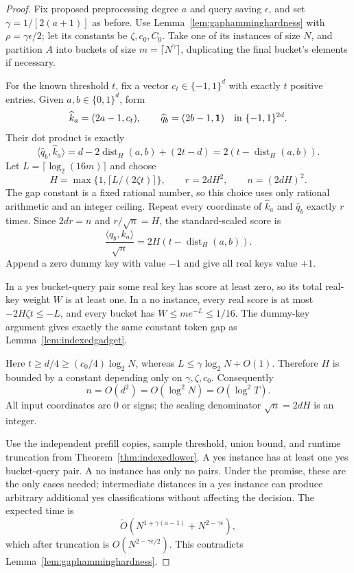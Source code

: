 \begin{proof}
Fix proposed preprocessing degree $a$ and query saving $\epsilon$,
and set $\gamma=1/[2(a+1)]$ as before.  Use
Lemma~\ref{lem:gaphamminghardness} with
$\rho=\gamma\epsilon/2$; let its constants be $\zeta,c_0,C_0$.
Take one of its instances of size $N$, and partition $A$ into buckets
of size $m=\lceil N^\gamma\rceil$, duplicating the final bucket's
elements if necessary.

For the known threshold $t$, fix a vector $c_t\in\{-1,1\}^d$
with exactly $t$ positive entries.  Given $a,b\in\{0,1\}^d$, form
\[
 \widehat k_a=(2a-1,c_t),\qquad
 \widehat q_b=(2b-1,\boldsymbol1)
 \quad\hbox{in }\{-1,1\}^{2d}.
\]
Their dot product is exactly
\begin{equation}
 \langle\widehat q_b,\widehat k_a\rangle
 =d-2\operatorname{dist}_H(a,b)+(2t-d)
 =2(t-\operatorname{dist}_H(a,b)).
 \label{eq:gaphammingdot}
\end{equation}
Let $L=\lceil\log_2(16m)\rceil$ and choose
\[
 H=\max\{1,\lceil L/(2\zeta t)\rceil\},\qquad
 r=2dH^2,\qquad n=(2dH)^2.
\]
The gap constant is a fixed rational number, so this choice uses only
rational arithmetic and an integer ceiling.  Repeat every coordinate
of $\widehat k_a$ and $\widehat q_b$ exactly $r$ times.  Since
$2dr=n$ and $r/\sqrt n=H$, the standard-scaled score is
\[
 \frac{\langle q_b,k_a\rangle}{\sqrt n}
 =2H(t-\operatorname{dist}_H(a,b)).
\]
Append a zero dummy key with value $-1$ and give all real keys value
$+1$.

In a yes bucket-query pair some real key has score at least zero,
so its total real-key weight $W$ is at least one.  In a no instance,
every real score is at most $-2H\zeta t\le-L$, and every bucket has
$W\le m e^{-L}\le1/16$.  The dummy-key argument gives exactly the
same constant token gap as Lemma~\ref{lem:indexedgadget}.

Here $t\ge d/4\ge(c_0/4)\log_2N$, whereas
$L\le\gamma\log_2N+O(1)$.  Therefore $H$ is bounded by a constant
depending only on $\gamma,\zeta,c_0$.  Consequently
\[
 n=O(d^2)=O(\log^2N)=O(\log^2T).
\]
All input coordinates are $0$ or signs; the scaling denominator
$\sqrt n=2dH$ is an integer.

Use the independent prefill copies, sample threshold, union bound,
and runtime truncation from Theorem~\ref{thm:indexedlower}.  A yes
instance has at least one yes bucket-query pair.  A no instance has
only no pairs.  Under the promise, these are the only cases needed;
intermediate distances in a yes instance can produce arbitrary
additional yes classifications without affecting the decision.
The expected time is
\[
 \widetilde O\left(N^{1+\gamma(a-1)}
                 +N^{2-\gamma\epsilon}\right),
\]
which after truncation is
$O(N^{2-\gamma\epsilon/2})$.  This contradicts
Lemma~\ref{lem:gaphamminghardness}.
\end{proof}

